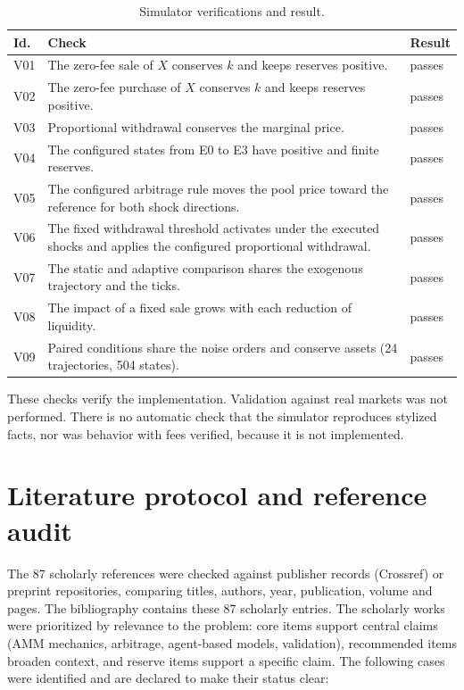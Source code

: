 \begin{table}[htbp]
\centering
\caption{Simulator verifications and result.}
\label{tab:verificacion}
\small
\begin{tabularx}{\textwidth}{@{}l X l@{}}
\toprule
Id. & Check & Result \\
\midrule
V01 & The zero-fee sale of $X$ conserves $k$ and keeps reserves positive. & passes \\
V02 & The zero-fee purchase of $X$ conserves $k$ and keeps reserves positive. & passes \\
V03 & Proportional withdrawal conserves the marginal price. & passes \\
V04 & The configured states from E0 to E3 have positive and finite reserves. & passes \\
V05 & The configured arbitrage rule moves the pool price toward the reference for both shock directions. & passes \\
V06 & The fixed withdrawal threshold activates under the executed shocks and applies the configured proportional withdrawal. & passes \\
V07 & The static and adaptive comparison shares the exogenous trajectory and the ticks. & passes \\
V08 & The impact of a fixed sale grows with each reduction of liquidity. & passes \\
V09 & Paired conditions share the noise orders and conserve assets (24 trajectories, 504 states). & passes \\
\bottomrule
\end{tabularx}
\end{table}

These checks verify the implementation. Validation against real markets was not performed. There is no automatic check that the simulator reproduces stylized facts, nor was behavior with fees verified, because it is not implemented.

\section{Literature protocol and reference audit}
\label{sec:protocolo-literatura}

The 87 scholarly references were checked against publisher records (Crossref) or preprint repositories, comparing titles, authors, year, publication, volume and pages. The bibliography contains these 87 scholarly entries. The scholarly works were prioritized by relevance to the problem: core items support central claims (AMM mechanics, arbitrage, agent-based models, validation), recommended items broaden context, and reserve items support a specific claim. The following cases were identified and are declared to make their status clear:

